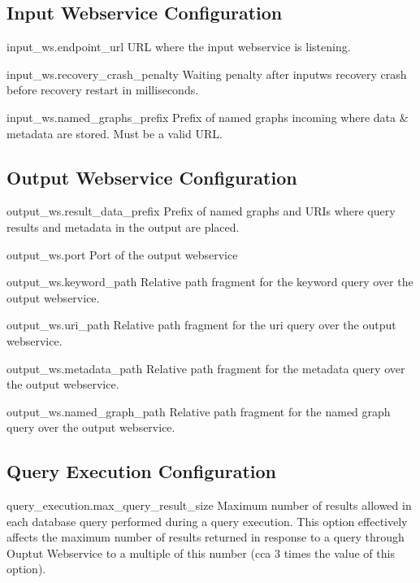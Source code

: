 \subsection*{Input Webservice Configuration}
\begin{configlist}
	\item[input\_ws.endpoint\_url]
		URL where the input webservice is listening.
	\item[input\_ws.recovery\_crash\_penalty]
		Waiting penalty after inputws recovery crash before recovery restart in milliseconds.
	\item[input\_ws.named\_graphs\_prefix]
		Prefix of named graphs incoming where data \& metadata are stored. Must be a valid URL.
\end{configlist}

\subsection*{Output Webservice Configuration}
\begin{configlist}
	\item[output\_ws.result\_data\_prefix]
		Prefix of named graphs and URIs where query results and metadata in the output are placed.
	\item[output\_ws.port]
		Port of the output webservice
	\item[output\_ws.keyword\_path]
		Relative path fragment for the keyword query over the output webservice.
	\item[output\_ws.uri\_path]
		Relative path fragment for the uri query over the output webservice.
	\item[output\_ws.metadata\_path]
		Relative path fragment for the metadata query over the output webservice.
	\item[output\_ws.named\_graph\_path]
		Relative path fragment for the named graph query over the output webservice.
\end{configlist}

\subsection*{Query Execution Configuration}	
\begin{configlist}
	\item[query\_execution.max\_query\_result\_size]
		Maximum number of results allowed in each database query performed during a query execution. This option effectively affects the maximum number of results returned in response to a query through Ouptut Webservice to a multiple of this number (cca 3 times the value of this option).
\end{configlist}

